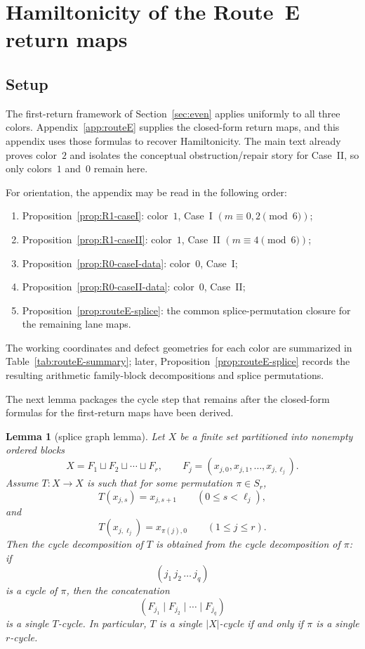 \documentclass[11pt]{article}
\newtheorem{lemma}{Lemma}
\begin{document}
\section{Hamiltonicity of the Route~E return maps}\label{app:routeE-cycle}

\subsection{Setup}

The first-return framework of Section~\ref{sec:even} applies uniformly to all three colors.
Appendix~\ref{app:routeE} supplies the closed-form return maps, and this appendix uses those formulas to recover Hamiltonicity.
The main text already proves color~$2$ and isolates the conceptual obstruction/repair story for Case~II, so only colors~$1$ and~$0$ remain here.

For orientation, the appendix may be read in the following order:
\begin{enumerate}[label=\textup{(\roman*)},leftmargin=2.5em]
\item Proposition~\ref{prop:R1-caseI}: color~$1$, Case~I $(m\equiv 0,2\pmod 6)$;
\item Proposition~\ref{prop:R1-caseII}: color~$1$, Case~II $(m\equiv 4\pmod 6)$;
\item Proposition~\ref{prop:R0-caseI-data}: color~$0$, Case~I;
\item Proposition~\ref{prop:R0-caseII-data}: color~$0$, Case~II;
\item Proposition~\ref{prop:routeE-splice}: the common splice-permutation closure for the remaining lane maps.
\end{enumerate}
The working coordinates and defect geometries for each color are summarized in Table~\ref{tab:routeE-summary}; later, Proposition~\ref{prop:routeE-splice} records the resulting arithmetic family-block decompositions and splice permutations.

The next lemma packages the cycle step that remains after the closed-form formulas for the first-return maps have been derived.


\begin{lemma}[splice graph lemma]\label{lem:splice-graph}
Let $X$ be a finite set partitioned into nonempty ordered blocks
\[
X=F_1\sqcup F_2\sqcup \cdots \sqcup F_r,
\qquad
F_j=(x_{j,0},x_{j,1},\dots,x_{j,\ell_j}).
\]
Assume $T:X\to X$ is such that for some permutation $\pi\in S_r$,
\[
T(x_{j,s})=x_{j,s+1}\qquad (0\le s<\ell_j),
\]
and
\[
T(x_{j,\ell_j})=x_{\pi(j),0}\qquad (1\le j\le r).
\]
Then the cycle decomposition of $T$ is obtained from the cycle decomposition of $\pi$: if
\[
(j_1\,j_2\,\dots\,j_q)
\]
is a cycle of $\pi$, then the concatenation
\[
(F_{j_1}\mid F_{j_2}\mid \cdots \mid F_{j_q})
\]
is a single $T$-cycle.
In particular, $T$ is a single $|X|$-cycle if and only if $\pi$ is a single $r$-cycle.
\end{lemma}
\end{document}
